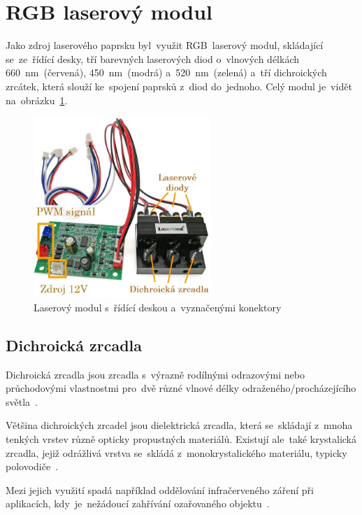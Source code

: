 \section{RGB laserový modul}
Jako zdroj laserového paprsku  byl~využit  RGB~laserový modul, skládající se~ze~řídící desky, tří barevných laserových diod  o~vlnových délkách 660~nm~(červená), 450~nm~(modrá) a~520~nm~(zelená) a~tří dichroických zrcátek, která slouží ke~spojení paprsků z~diod do~jednoho. Celý modul je~vidět na~obrázku~\ref{fig:hw_laser-module}.


\begin{figure}[htb]
  \centering
  \includegraphics[width=0.6\textwidth]{img/hw_laser-module.jpg}
  \caption{\label{fig:hw_laser-module} Laserový modul  s~řídící deskou  a~vyznačenými konektory}
\end{figure}

\subsection{Dichroická zrcadla}

Dichroická zrcadla jsou zrcadla  s~výrazně rodílnými odrazovými nebo průchodovými vlastnostmi  pro~dvě různé vlnové délky odraženého/procházejícího světla~\cite{dichroic-mirrors}.

Většina dichroických zrcadel jsou dielektrická zrcadla, která se~skládají z~mnoha tenkých vrstev různě opticky propustných materiálů. Existují  ale~také krystalická zrcadla, jejiž odrážlivá vrstva se~skládá z~monokrystalického materiálu, typicky polovodiče~\cite{dichroic-mirrors}.

Mezi jejich využití spadá například oddělování infračerveného záření při aplikacích,  kdy~je~nežádoucí zahřívání ozařovaného objektu~\cite{dichroic-mirrors}.

